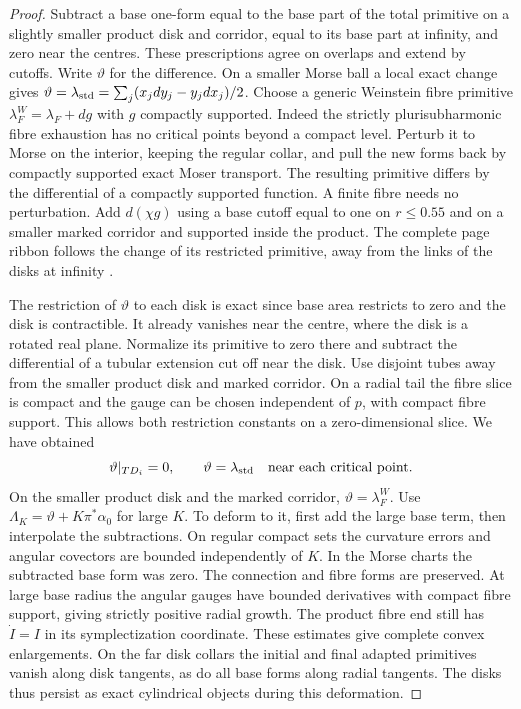 \begin{proof}
Subtract a base one-form equal to the base part of the total primitive on a slightly smaller product disk and corridor, equal to its base part at infinity, and zero near the centres. These prescriptions agree on overlaps and extend by cutoffs. Write $\vartheta$ for the difference. On a smaller Morse ball a local exact change gives $\vartheta=\lambda_{\rm std}=\sum_j(x_jdy_j-y_jdx_j)/2$. Choose a generic Weinstein fibre primitive $\lambda_F^W=\lambda_F+dg$ with $g$ compactly supported. Indeed the strictly plurisubharmonic fibre exhaustion has no critical points beyond a compact level. Perturb it to Morse on the interior, keeping the regular collar, and pull the new forms back by compactly supported exact Moser transport. The resulting primitive differs by the differential of a compactly supported function. A finite fibre needs no perturbation. Add $d(\chi g)$ using a base cutoff equal to one on $r\le0.55$ and on a smaller marked corridor and supported inside the product. The complete page ribbon follows the change of its restricted primitive, away from the links of the disks at infinity \cite[Example~3.11]{GPS}.

The restriction of $\vartheta$ to each disk is exact since base area restricts to zero and the disk is contractible. It already vanishes near the centre, where the disk is a rotated real plane. Normalize its primitive to zero there and subtract the differential of a tubular extension cut off near the disk. Use disjoint tubes away from the smaller product disk and marked corridor. On a radial tail the fibre slice is compact and the gauge can be chosen independent of $p$, with compact fibre support. This allows both restriction constants on a zero-dimensional slice. We have obtained
\[
  \vartheta|_{TD_i}=0,\qquad \vartheta=\lambda_{\rm std}
                     \quad\text{near each critical point}.
\]
On the smaller product disk and the marked corridor, $\vartheta=\lambda_F^W$. Use $\Lambda_K=\vartheta+K\pi^*\alpha_0$ for large $K$. To deform to it, first add the large base term, then interpolate the subtractions. On regular compact sets the curvature errors and angular covectors are bounded independently of $K$. In the Morse charts the subtracted base form was zero. The connection and fibre forms are preserved. At large base radius the angular gauges have bounded derivatives with compact fibre support, giving strictly positive radial growth. The product fibre end still has $\dot I=I$ in its symplectization coordinate. These estimates give complete convex enlargements. On the far disk collars the initial and final adapted primitives vanish along disk tangents, as do all base forms along radial tangents. The disks thus persist as exact cylindrical objects during this deformation.


\end{proof}
